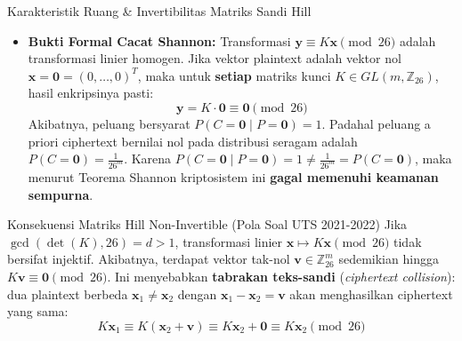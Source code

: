 \documentclass[11pt,a4paper]{article}
\begin{document}
\begin{thmbox}{Karakteristik Ruang \& Invertibilitas Matriks Sandi Hill}
\begin{itemize}[leftmargin=*]
\begin{itemize}
        \item \textbf{Bukti Formal Cacat Shannon:} Transformasi $\mathbf{y} \equiv K\mathbf{x} \pmod{26}$ adalah transformasi linier homogen. Jika vektor plaintext adalah vektor nol $\mathbf{x} = \mathbf{0} = (0, \dots, 0)^T$, maka untuk \textbf{setiap} matriks kunci $K \in GL(m, \mathbb{Z}_{26})$, hasil enkripsinya pasti:
        \[
        \mathbf{y} = K \cdot \mathbf{0} \equiv \mathbf{0} \pmod{26}
        \]
        Akibatnya, peluang bersyarat $P(C = \mathbf{0} \mid P = \mathbf{0}) = 1$. Padahal peluang a priori ciphertext bernilai nol pada distribusi seragam adalah $P(C = \mathbf{0}) = \frac{1}{26^m}$.
        Karena $P(C = \mathbf{0} \mid P = \mathbf{0}) = 1 \neq \frac{1}{26^m} = P(C = \mathbf{0})$, maka menurut Teorema Shannon kriptosistem ini \textbf{gagal memenuhi keamanan sempurna}.
    \end{itemize}
\end{itemize}
\end{thmbox}

\begin{perhatianbox}{Konsekuensi Matriks Hill Non-Invertible (Pola Soal UTS 2021-2022)}
Jika $\gcd(\det(K), 26) = d > 1$, transformasi linier $\mathbf{x} \mapsto K\mathbf{x} \pmod{26}$ tidak bersifat injektif. Akibatnya, terdapat vektor tak-nol $\mathbf{v} \in \mathbb{Z}_{26}^m$ sedemikian hingga $K\mathbf{v} \equiv \mathbf{0} \pmod{26}$. Ini menyebabkan \textbf{tabrakan teks-sandi} (\textit{ciphertext collision}): dua plaintext berbeda $\mathbf{x}_1 \neq \mathbf{x}_2$ dengan $\mathbf{x}_1 - \mathbf{x}_2 = \mathbf{v}$ akan menghasilkan ciphertext yang sama:
\[
K\mathbf{x}_1 \equiv K(\mathbf{x}_2 + \mathbf{v}) \equiv K\mathbf{x}_2 + \mathbf{0} \equiv K\mathbf{x}_2 \pmod{26}
\]
\end{perhatianbox}
\end{document}
